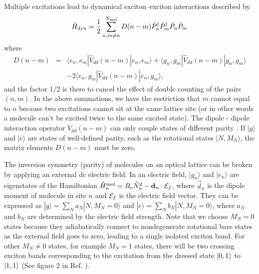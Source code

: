 Multiple excitations lead to dynamical exciton--exciton interactions described by \cite{agranovich}
\begin{equation}\label{dynamical}
\hat{H}_{\rm dyn} = \frac{1}{2} \sum\limits_{n,m \neq n}^{N_{\rm mol}} D(n-m)
\hat{P}_{n}^\dag \hat{P}_{m}^\dag \hat{P}_{n} \hat{P}_{m} 
\end{equation}
where 
\begin{eqnarray}
D(n - m)& =& \langle e_{n}, e_{m} | \hat{V}_{dd}(n-m) | e_{n}, e_{m} \rangle +
\langle g_{n}, g_{m} | \hat{V}_{dd}(n-m) | g_{n}, g_{m} \rangle  \nonumber \\
& & - 2\langle e_{n}, g_{m} |\hat{V}_{dd}(n-m) | e_{n}, g_{m} \rangle ,
\end{eqnarray} 
and the factor 1/2 is there to cancel the effect of double counting of the pairs $(n, m)$. In the above summations, we
 have the restriction that $m$ cannot equal to $n$ because two excitations cannot sit at the same lattice site (or in other
 words a molecule can't be excited twice to the same excited state). The dipole - dipole interaction operator
 $\hat{V}_{dd}(n-m)$ can only couple states of different parity \cite{RotSpect}. If $|g \rangle$ and $| e \rangle$ are
 states of well-defined parity, such as the rotational states $|N, M_N \rangle$, the matrix elements $D(n-m)$ must be
 zero. 

 The inversion symmetry (parity) of molecules on an optical lattice can be broken by applying an external dc electric
 field. In an electric field, $|g_{n} \rangle$ and $| e_{n} \rangle$ are eigenstates of the Hamiltonian 
$\hat{H}^{\rm mol}_n = B_e \hat{N}_n^2 - {\vec d}_n \cdot  {\vec {\cal E}_f}$, where ${\vec d}_n$ is the dipole moment
 of molecule in site $n$ and ${\vec {\cal E}_f}$ is the electric field vector. They can be expressed as 
$| g \rangle = \sum_N a_N |N, M_N = 0 \rangle$ and $| e \rangle = \sum_N b_N |N, M_N = 0 \rangle$, where 
 $a_N$ and $b_N$ are determined by the electric field strength. Note that we choose $M_N=0$ states because they
 adiabatically connect to nondegenerate rotational bare states as the external field goes to zero, leading to a single isolated exciton band. For other $M_N\neq0$ states, for example $M_N = 1$ states, there will be two crossing exciton
bands corresponding to the excitation from the dressed state $\ket{0, 1}$ to $\ket{1, 1}$ (See figure 2 in Ref. \cite{felipe}).
 
